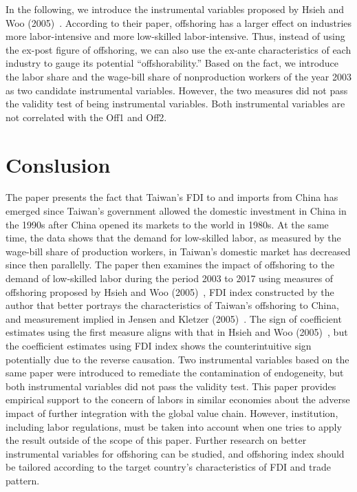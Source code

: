 \documentclass{article}
\begin{document}
In the following, we introduce the instrumental variables proposed by Hsieh and Woo (2005)~\cite{hsieh2005impact}. According to their paper, offshoring has a larger effect on industries more labor-intensive and more low-skilled labor-intensive. Thus, instead of using the ex-post figure of offshoring, we can also use the ex-ante characteristics of each industry to gauge its potential “offshorability.” Based on the fact, we introduce the labor share and the wage-bill share of nonproduction workers of the year 2003 as two candidate instrumental variables. However, the two measures did not pass the validity test of being instrumental variables. Both instrumental variables are not correlated with the Off1 and Off2.\par


\section{Conslusion}

The paper presents the fact that Taiwan’s FDI to and imports from China has emerged since Taiwan’s government allowed the domestic investment in China in the 1990s after China opened its markets to the world in 1980s. At the same time, the data shows that the demand for low-skilled labor, as measured by the wage-bill share of production workers, in Taiwan’s domestic market has decreased since then parallelly. The paper then examines the impact of offshoring to the demand of low-skilled labor during the period 2003 to 2017 using measures of offshoring proposed by Hsieh and Woo (2005)~\cite{hsieh2005impact}, FDI index constructed by the author that better portrays the characteristics of Taiwan’s offshoring to China, and measurement implied in Jensen and Kletzer (2005)~\cite{jensen2005tradable}. The sign of coefficient estimates using the first measure aligns with that in Hsieh and Woo (2005)~\cite{hsieh2005impact}, but the coefficient estimates using FDI index shows the counterintuitive sign potentially due to the reverse causation. Two instrumental variables based on the same paper were introduced to remediate the contamination of endogeneity, but both instrumental variables did not pass the validity test. This paper provides empirical support to the concern of labors in similar economies about the adverse impact of further integration with the global value chain. However, institution, including labor regulations, must be taken into account when one tries to apply the result outside of the scope of this paper. Further research on better instrumental variables for offshoring can be studied, and offshoring index should be tailored according to the target country’s characteristics of FDI and trade pattern.\par



\end{document}

